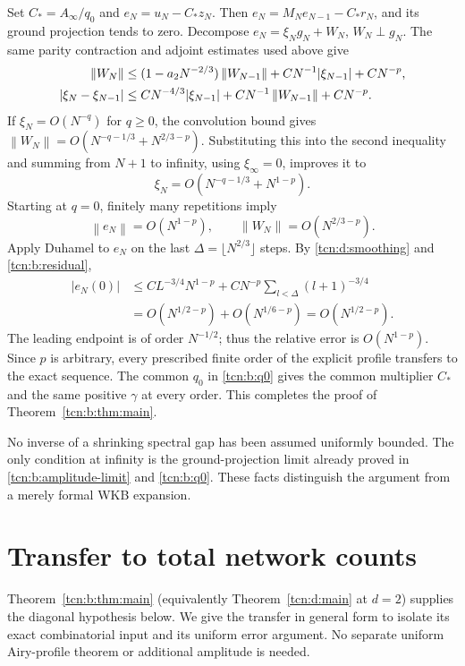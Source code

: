 \documentclass[11pt,letterpaper]{article}
\newcommand{\norm}[1]{\left\lVert#1\right\rVert}
\theoremstyle{remark}
\begin{document}
Set $C_\ast=A_\infty/q_0$ and $e_N=u_N-C_\ast z_N$. Then
$e_N=M_Ne_{N-1}-C_\ast r_N$, and its ground projection tends to zero. Decompose $e_N=\xi_Ng_N+W_N$, $W_N\perp g_N$. The same parity contraction and adjoint estimates used above give
\begin{align}
 \norm{W_N}&\le(1-a_2N^{-2/3})\norm{W_{N-1}}
                  +CN^{-1}|\xi_{N-1}|+CN^{-p},\notag\\
 |\xi_N-\xi_{N-1}|&\le CN^{-4/3}|\xi_{N-1}|
                  +CN^{-1}\norm{W_{N-1}}+CN^{-p}.          \label{tcn:b:bootstrap}
\end{align}
If $\xi_N=O(N^{-q})$ for $q\ge0$, the convolution bound gives
$\norm{W_N}=O(N^{-q-1/3}+N^{2/3-p})$. Substituting this into the second inequality and summing from $N+1$ to infinity, using $\xi_\infty=0$, improves it to
\[
 \xi_N=O(N^{-q-1/3}+N^{1-p}).
\]
Starting at $q=0$, finitely many repetitions imply
\begin{equation}
 \norm{e_N}=O(N^{1-p}),\qquad \norm{W_N}=O(N^{2/3-p}).       \label{tcn:b:bootstrap-final}
\end{equation}
Apply Duhamel to $e_N$ on the last $\Delta=\lfloor N^{2/3}\rfloor$ steps. By \eqref{tcn:d:smoothing} and \eqref{tcn:b:residual},
\begin{align*}
 |e_N(0)|&\le CL^{-3/4}N^{1-p}
                +CN^{-p}\sum_{l<\Delta}(l+1)^{-3/4}\\
 &=O(N^{1/2-p})+O(N^{1/6-p})=O(N^{1/2-p}).
\end{align*}
The leading endpoint is of order $N^{-1/2}$; thus the relative error is $O(N^{1-p})$. Since $p$ is arbitrary, every prescribed finite order of the explicit profile transfers to the exact sequence. The common $q_0$ in \eqref{tcn:b:q0} gives the common multiplier $C_\ast$ and the same positive $\gamma$ at every order. This completes the proof of Theorem~\ref{tcn:b:thm:main}.

No inverse of a shrinking spectral gap has been assumed uniformly bounded. The only condition at infinity is the ground-projection limit already proved in \eqref{tcn:b:amplitude-limit} and \eqref{tcn:b:q0}. These facts distinguish the argument from a merely formal WKB expansion.
\section{Transfer to total network
counts}\label{tcn:b:sec:transfer}

Theorem~\ref{tcn:b:thm:main} (equivalently Theorem~\ref{tcn:d:main} at $d=2$) supplies the diagonal hypothesis below. We give the transfer
in general form to isolate its exact combinatorial input and its uniform
error argument. No separate uniform Airy-profile theorem or additional
amplitude is needed.
\end{document}
